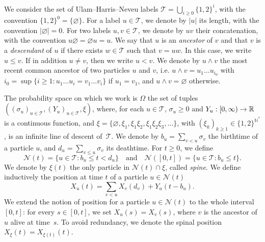 \documentclass[AHL,Unicode,longabstracts,published]{cedram}
\newcommand{\N}{\mathbb{N}}
\newcommand{\R}{\mathbb{R}}
\newcommand\1{\mathds{1}}
\newcommand{\cN}{\mathcal{N}}
\newcommand{\cT}{\mathcal{T}}
\renewcommand*{\to}{\mathchoice{\longrightarrow}{\rightarrow}{\rightarrow}{\rightarrow}}
\begin{document}
We consider the set of Ulam--Harris--Neveu labels $\cT = \bigcup_{i \geq 0} \{1, 2\}^i$, with the convention $\{1, 2\}^0 = \{\varnothing\}$. For a label $u \in \cT$, we denote by $|u|$ its length, with the convention $|\varnothing| = 0$. For two labels $u, v \in \cT$, we denote by $uv$ their concatenation, with the convention $u \varnothing = \varnothing u = u$. We say that $u$ is an \emph{ancestor} of $v$ and that $v$ is a \emph{descendant} of $u$ if there exists $w \in \cT$ such that $v = uw$. In this case, we write $u \leq v$. If in addition $u \neq v$, then we write $u < v$. We denote by $u \wedge v$ the most recent common ancestor of two particles $u$ and $v$, i.e. $u \wedge v = u_1 \dots u_{i_0}$ with $i_0 = \sup\{i \geq 1 : u_1 \dots u_i = v_1 \dots v_i\}$ if $u_1 = v_1$, and $u \wedge v = \varnothing$ otherwise.

The probability space on which we work is $\Omega$ the set of tuples $((\sigma_u)_{u \in \cT}, (Y_u)_{u \in \cT}, \xi)$, where, for each $u \in \cT$, $\sigma_u \geq 0$ and $Y_u : [0, \infty) \to \R$ is a continuous function, and $\xi = \{ \varnothing, \xi_1, \xi_1\xi_2, \xi_1\xi_2\xi_3, \dots \}$, with $(\xi_k)_{k\geq 1}\in \{1,2\}^{\N^*}$, is an infinite line of descent of~$\cT$. We denote by $b_u = \sum_{v < u} \sigma_v$ the birthtime of a particle $u$, and $d_u = \sum_{v \leq u} \sigma_v$ its deathtime. For $t \geq 0$, we define
\begin{equation*}
\cN(t) = \{u \in \cT : b_u \leq t < d_u\} \quad \text{and} \quad \cN([0, t]) = \{u \in \cT : b_u \leq t\}.
\end{equation*}
We denote by $\xi(t)$ the only particle in $\cN(t) \cap \xi$, called \emph{spine}. We define inductively the position at time $t$ of a particle $u \in \cN(t)$
\begin{equation*}
X_u(t) = \sum_{v < u} X_v(d_v) + Y_u(t - b_u).
\end{equation*}
We extend the notion of position for a particle $u \in \cN(t)$ to the whole interval $[0, t]$: for every $s \in [0, t]$, we set $X_u(s) = X_v(s)$, where $v$ is the ancestor of $u$ alive at time~$s$. To avoid redundancy, we denote the spinal position $X_\xi(t) = X_{\xi(t)}(t)$.
\end{document}
